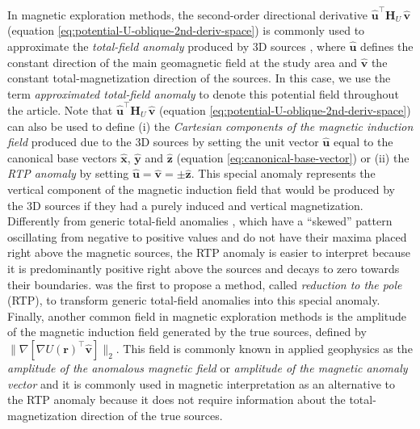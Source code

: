 \documentclass[manuscript,noblind]{geophysics}
\begin{document}
	In magnetic exploration methods, the second-order directional derivative 
	$\hat{\mathbf{u}}^{\top} \mathbf{H}_{U} \, \hat{\mathbf{v}}$ (equation \ref{eq:potential-U-oblique-2nd-deriv-space})
	is commonly used to approximate the \textit{total-field anomaly} produced by 3D sources \cite[e.g., ][ p. 179]{blakely1996},
	where $\hat{\mathbf{u}}$ defines the constant direction of the main geomagnetic
	field at the study area and $\hat{\mathbf{v}}$ the constant total-magnetization direction of the sources.
	In this case, we use the term \textit{approximated total-field anomaly} to denote this 
	potential field throughout the article.
	Note that $\hat{\mathbf{u}}^{\top} \mathbf{H}_{U} \, \hat{\mathbf{v}}$ 
	(equation \ref{eq:potential-U-oblique-2nd-deriv-space}) can also be used to define (i) the  
	\textit{Cartesian components of the magnetic induction field} produced due to the 3D
	sources by setting the unit vector $\hat{\mathbf{u}}$ equal to the canonical base vectors $\hat{\mathbf{x}}$,
	$\hat{\mathbf{y}}$ and $\hat{\mathbf{z}}$ (equation \ref{eq:canonical-base-vector}) or (ii)
	the \textit{RTP anomaly} by setting $\hat{\mathbf{u}} = \hat{\mathbf{v}} = \pm\hat{\mathbf{z}}$.
	This special anomaly represents the vertical component of 
	the magnetic induction field that would be produced by the 3D sources if they had a 
	purely induced and vertical magnetization. Differently from generic total-field anomalies 
	\cite[e.g.,][ p. 178]{blakely1996}, which have a ``skewed'' pattern 
	oscillating from negative to positive values and do not have their maxima placed right 
	above the magnetic sources, the RTP anomaly is easier to interpret 
	because it is predominantly positive right above the sources and
	decays to zero towards their boundaries. \citet{baranov1957} was the first
	to propose a method, called \textit{reduction to the pole} (RTP), to transform generic
	total-field anomalies into this special anomaly.
	Finally, another common field in magnetic exploration methods is the amplitude of 
	the magnetic induction field generated by the true sources, defined by 
	$\| \nabla \left[\nabla U(\mathbf{r})^{\top} \hat{\mathbf{v}}\right] \|_{2}$. 
	This field is commonly known in applied geophysics as the 
	\textit{amplitude of the anomalous magnetic field} \citep{li_etal2010} or 
	\textit{amplitude of the magnetic anomaly vector} \citep{hidalgo_gato_etal2021, melo_etal2021} 
	and it is commonly used in magnetic interpretation as an alternative to the RTP anomaly 
	because it does not require information about the total-magnetization direction of the 
	true sources.
	
\end{document}
